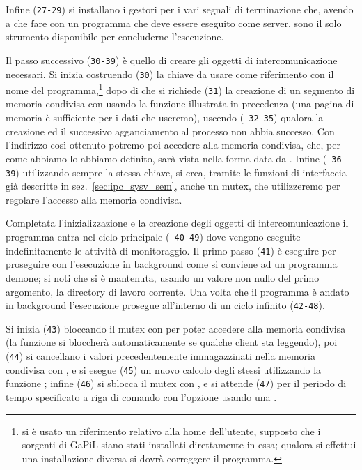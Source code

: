 Infine (\texttt{\small 27-29}) si installano i gestori per i vari segnali di
terminazione che, avendo a che fare con un programma che deve essere eseguito
come server, sono il solo strumento disponibile per concluderne l'esecuzione.

Il passo successivo (\texttt{\small 30-39}) è quello di creare gli oggetti di
intercomunicazione necessari. Si inizia costruendo (\texttt{\small 30}) la
chiave da usare come riferimento con il nome del programma,\footnote{si è
  usato un riferimento relativo alla home dell'utente, supposto che i sorgenti
  di GaPiL siano stati installati direttamente in essa; qualora si effettui
  una installazione diversa si dovrà correggere il programma.} dopo di che si
richiede (\texttt{\small 31}) la creazione di un segmento di memoria condivisa
con usando la funzione  illustrata in precedenza (una pagina
di memoria è sufficiente per i dati che useremo), uscendo (\texttt{\small
  32-35}) qualora la creazione ed il successivo agganciamento al processo non
abbia successo. Con l'indirizzo  così ottenuto potremo poi
accedere alla memoria condivisa, che, per come abbiamo lo abbiamo definito,
sarà vista nella forma data da . Infine (\texttt{\small
  36-39}) utilizzando sempre la stessa chiave, si crea, tramite le funzioni
di interfaccia già descritte in sez.~\ref{sec:ipc_sysv_sem}, anche un mutex,
che utilizzeremo per regolare l'accesso alla memoria condivisa.

Completata l'inizializzazione e la creazione degli oggetti di
intercomunicazione il programma entra nel ciclo principale (\texttt{\small
  40-49}) dove vengono eseguite indefinitamente le attività di monitoraggio.
Il primo passo (\texttt{\small 41}) è eseguire  per proseguire
con l'esecuzione in background come si conviene ad un programma demone; si
noti che si è mantenuta, usando un valore non nullo del primo argomento, la
directory di lavoro corrente.  Una volta che il programma è andato in
background l'esecuzione prosegue all'interno di un ciclo infinito
(\texttt{\small 42-48}).

Si inizia (\texttt{\small 43}) bloccando il mutex con  per
poter accedere alla memoria condivisa (la funzione si bloccherà
automaticamente se qualche client sta leggendo), poi (\texttt{\small 44}) si
cancellano i valori precedentemente immagazzinati nella memoria condivisa con
, e si esegue (\texttt{\small 45}) un nuovo calcolo degli stessi
utilizzando la funzione ; infine (\texttt{\small 46}) si
sblocca il mutex con , e si attende (\texttt{\small 47}) per
il periodo di tempo specificato a riga di comando con l'opzione 
usando una .

